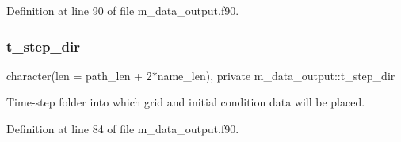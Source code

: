 Definition at line 90 of file m\+\_\+data\+\_\+output.\+f90.

\mbox{\label{namespacem__data__output_aba17ac5a2fbc723664abf5c17e07c4e8}} 
\subsubsection{\texorpdfstring{t\+\_\+step\+\_\+dir}{t\_step\_dir}}
{\footnotesize\ttfamily character(len = path\+\_\+len + 2$\ast$name\+\_\+len), private m\+\_\+data\+\_\+output\+::t\+\_\+step\+\_\+dir\hspace{0.3cm}{\ttfamily [private]}}



Time-\/step folder into which grid and initial condition data will be placed. 



Definition at line 84 of file m\+\_\+data\+\_\+output.\+f90.

